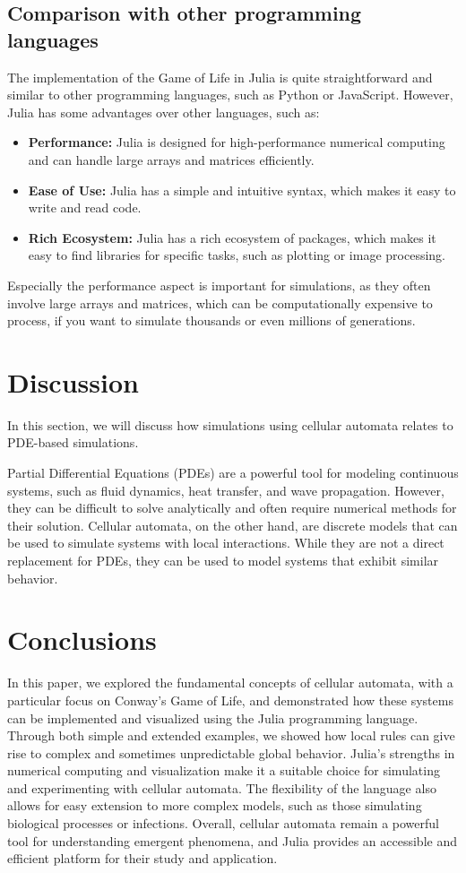 \documentclass[a4paper,12pt]{llncs}
\numberwithin{equation}{section}
\begin{document}
\subsection{Comparison with other programming languages}
The implementation of the Game of Life in Julia is quite straightforward and similar to other programming languages, such as Python or JavaScript.
However, Julia has some advantages over other languages, such as:
\begin{itemize}
  \item \textbf{Performance:} Julia is designed for high-performance numerical computing and can handle large arrays and matrices efficiently.
  \item \textbf{Ease of Use:} Julia has a simple and intuitive syntax, which makes it easy to write and read code.
  \item \textbf{Rich Ecosystem:} Julia has a rich ecosystem of packages, which makes it easy to find libraries for specific tasks, such as plotting or image processing.
\end{itemize}
Especially the performance aspect is important for simulations, as they often involve large arrays and matrices,
which can be computationally expensive to process, if you want to simulate thousands or even millions of generations.
\section{Discussion}
In this section, we will discuss how simulations using cellular automata relates to PDE-based simulations.

Partial Differential Equations (PDEs) are a powerful tool for modeling continuous systems, such as fluid dynamics, heat transfer, and wave propagation.
However, they can be difficult to solve analytically and often require numerical methods for their solution.
Cellular automata, on the other hand, are discrete models that can be used to simulate systems with local interactions.
While they are not a direct replacement for PDEs, they can be used to model systems that exhibit similar behavior.

\section{Conclusions}
In this paper, we explored the fundamental concepts of cellular automata, with a particular focus on Conway's Game of Life,
and demonstrated how these systems can be implemented and visualized using the Julia programming language.
Through both simple and extended examples, we showed how local rules can give rise to complex and sometimes unpredictable global behavior.
Julia's strengths in numerical computing and visualization make it a suitable choice for simulating and experimenting with cellular automata.
The flexibility of the language also allows for easy extension to more complex models, such as those simulating biological processes or infections.
Overall, cellular automata remain a powerful tool for understanding emergent phenomena,
and Julia provides an accessible and efficient platform for their study and application.



\end{document}
